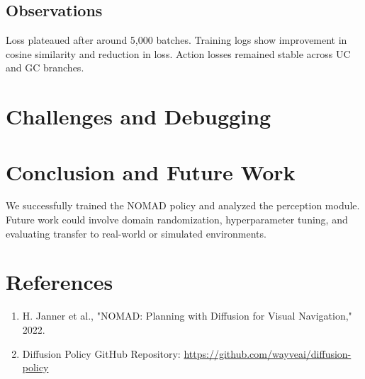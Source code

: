 \documentclass[12pt]{article}
\begin{document}
\subsection{Observations}
Loss plateaued after around 5,000 batches. Training logs show improvement in cosine similarity and reduction in loss. Action losses remained stable across UC and GC branches.

\section{Challenges and Debugging}


\section{Conclusion and Future Work}
We successfully trained the NOMAD policy and analyzed the perception module. Future work could involve domain randomization, hyperparameter tuning, and evaluating transfer to real-world or simulated environments.

\section*{References}
\begin{enumerate}
\item H. Janner et al., "NOMAD: Planning with Diffusion for Visual Navigation," 2022.
\item Diffusion Policy GitHub Repository: \url{https://github.com/wayveai/diffusion-policy}
\end{enumerate}
\end{document}
